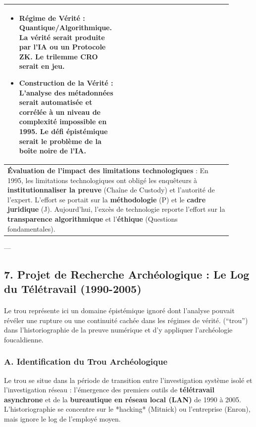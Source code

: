 \documentclass[memoire, 12pt]{report}
\begin{document}
\begin{longtable}{|p{0.45\linewidth}|p{0.45\linewidth}|}
\begin{itemize}
    \item \textbf{Régime de Vérité} : Quantique/Algorithmique. La vérité serait produite par l'IA ou un Protocole ZK. Le trilemme CRO serait en jeu.
    \item \textbf{Construction de la Vérité} : L'analyse des métadonnées serait automatisée et corrélée à un niveau de complexité impossible en 1995. Le défi épistémique serait le \textbf{problème de la boîte noire} de l'IA.
\end{itemize} \\
\hline
\multicolumn{2}{|p{0.9\linewidth}|}{\textbf{Évaluation de l'impact des limitations technologiques} : En 1995, les limitations technologiques ont obligé les enquêteurs à \textbf{institutionnaliser la preuve} (Chaîne de Custody) et l'autorité de l'expert. L'effort se portait sur la \textbf{méthodologie} (P) et le \textbf{cadre juridique} (J). Aujourd'hui, l'excès de technologie reporte l'effort sur la \textbf{transparence algorithmique} et l'\textbf{éthique} (Questions fondamentales).} \\
\hline
\end{longtable}

---
\subsection*{7. Projet de Recherche Archéologique : Le Log du Télétravail (1990-2005)}
\paragraph{}Le trou représente ici un domaine épistémique ignoré dont l'analyse pouvait révéler une rupture ou une continuité cachée dans les régimes de vérité.
\vspace{1em}
(\textquotedblleft trou\textquotedblright) dans l'historiographie de la preuve numérique et d'y appliquer l'archéologie foucaldienne.

\subsubsection*{A. Identification du Trou Archéologique}
Le trou se situe dans la période de transition entre l'investigation système isolé et l'investigation réseau : l'émergence des premiers outils de \textbf{télétravail asynchrone} et de la \textbf{bureautique en réseau local (LAN)} de 1990 à 2005. L'historiographie se concentre sur le *hacking* (Mitnick) ou l'entreprise (Enron), mais ignore le log de l'employé moyen.
\end{document}
